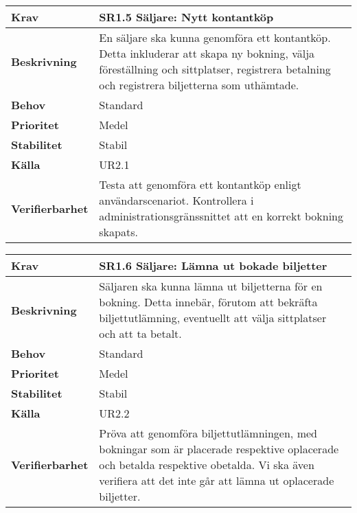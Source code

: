 \documentclass[a4paper, twoside, 11pt, titlepage]{article}
\begin{document}
		\begin {table} [ht] \begin{tabular} { p{2.6cm} p{12.5cm} }
			\hline
			\sffamily\textbf{Krav} & \sffamily\textbf{SR1.5 Säljare: Nytt kontantköp } \\
			\hline
			\sffamily\textbf{Beskrivning} & En säljare ska kunna genomföra ett kontantköp. Detta inkluderar att skapa ny bokning, välja föreställning och sittplatser, registrera betalning och registrera biljetterna som uthämtade.  \\
			\hline
			\sffamily\textbf{Behov} & Standard  \\
			\hline
			\sffamily\textbf{Prioritet} & Medel  \\
			\hline
			\sffamily\textbf{Stabilitet} & Stabil  \\
			\hline
			\sffamily\textbf{Källa} & UR2.1  \\
			\hline
			\sffamily\textbf{Verifierbarhet} & Testa att genomföra ett kontantköp enligt användarscenariot. Kontrollera i administrationsgränssnittet att en korrekt bokning skapats.  \\
			\hline
		\end{tabular} \end{table} \FloatBarrier
		\vspace{6mm}

		\begin {table} [ht] \begin{tabular} { p{2.6cm} p{12.5cm} }
			\hline
			\sffamily\textbf{Krav} & \sffamily\textbf{SR1.6 Säljare: Lämna ut bokade biljetter } \\
			\hline
			\sffamily\textbf{Beskrivning} & Säljaren ska kunna lämna ut biljetterna för en bokning. Detta innebär, förutom att bekräfta biljettutlämning, eventuellt att välja sittplatser och att ta betalt.  \\
			\hline
			\sffamily\textbf{Behov} & Standard  \\
			\hline
			\sffamily\textbf{Prioritet} & Medel  \\
			\hline
			\sffamily\textbf{Stabilitet} & Stabil  \\
			\hline
			\sffamily\textbf{Källa} & UR2.2  \\
			\hline
			\sffamily\textbf{Verifierbarhet} & Pröva att genomföra biljettutlämningen, med bokningar som är placerade respektive oplacerade och betalda respektive obetalda. Vi ska även verifiera att det inte går att lämna ut oplacerade biljetter.  \\
			\hline
		\end{tabular} \end{table} \FloatBarrier
\end{document}
